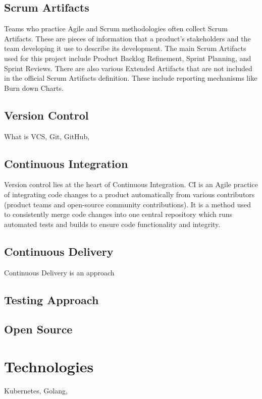 \documentclass{article}
\begin{document}
\subsection{Scrum Artifacts}
Teams who practice Agile and Scrum methodologies often collect Scrum Artifacts. These are pieces of information that a product's stakeholders and the team developing it use to describe its development. The main Scrum Artifacts used for this project include Product Backlog Refinement, Sprint Planning, and Sprint Reviews. There are also various Extended Artifacts that are not included in the official Scrum Artifacts definition. These include reporting mechanisms like Burn down Charts.


\subsection{Version Control}
What is VCS, Git, GitHub, 


\subsection{Continuous Integration}
Version control lies at the heart of Continuous Integration. CI is an Agile practice of integrating code changes to a product automatically from various contributors (product teams and open-source community contributions). It is a method used to consistently merge code changes into one central repository which runs automated tests and builds to ensure code functionality and integrity.   



\subsection{Continuous Delivery}
Continuous Delivery is an approach 


\subsection{Testing Approach}



\subsection{Open Source}



\section{Technologies}
Kubernetes, Golang, 
\end{document}
